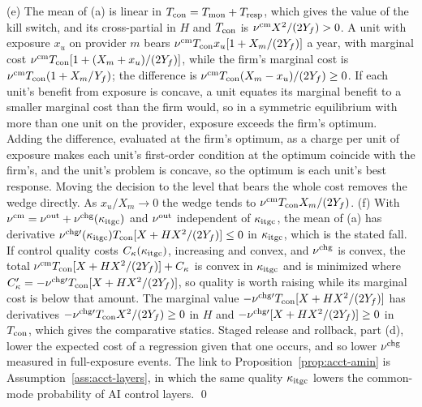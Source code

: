 (e) The mean of (a) is linear in $T_{\rm con}=T_{\rm mon}+T_{\rm resp}$, which gives the value of the kill switch, and its cross-partial in $H$ and $T_{\rm con}$ is $\nu^{\rm cm}X^2/(2Y_f)>0$. A unit with exposure $x_u$ on provider $m$ bears $\nu^{\rm cm}T_{\rm con}x_u[1+X_m/(2Y_f)]$ a year, with marginal cost $\nu^{\rm cm}T_{\rm con}[1+(X_m+x_u)/(2Y_f)]$, while the firm's marginal cost is $\nu^{\rm cm}T_{\rm con}(1+X_m/Y_f)$; the difference is $\nu^{\rm cm}T_{\rm con}(X_m-x_u)/(2Y_f)\ge0$. If each unit's benefit from exposure is concave, a unit equates its marginal benefit to a smaller marginal cost than the firm would, so in a symmetric equilibrium with more than one unit on the provider, exposure exceeds the firm's optimum. Adding the difference, evaluated at the firm's optimum, as a charge per unit of exposure makes each unit's first-order condition at the optimum coincide with the firm's, and the unit's problem is concave, so the optimum is each unit's best response. Moving the decision to the level that bears the whole cost removes the wedge directly. As $x_u/X_m\to0$ the wedge tends to $\nu^{\rm cm}T_{\rm con}X_m/(2Y_f)$.
(f) With $\nu^{\rm cm}=\nu^{\rm out}+\nu^{\rm chg}(\kappa_{\rm itgc})$ and $\nu^{\rm out}$ independent of $\kappa_{\rm itgc}$, the mean of (a) has derivative $\nu^{\rm chg\prime}(\kappa_{\rm itgc})T_{\rm con}[X+HX^2/(2Y_f)]\le0$ in $\kappa_{\rm itgc}$, which is the stated fall. If control quality costs $C_\kappa(\kappa_{\rm itgc})$, increasing and convex, and $\nu^{\rm chg}$ is convex, the total $\nu^{\rm cm}T_{\rm con}[X+HX^2/(2Y_f)]+C_\kappa$ is convex in $\kappa_{\rm itgc}$ and is minimized where $C_\kappa'=-\nu^{\rm chg\prime}T_{\rm con}[X+HX^2/(2Y_f)]$, so quality is worth raising while its marginal cost is below that amount. The marginal value $-\nu^{\rm chg\prime}T_{\rm con}[X+HX^2/(2Y_f)]$ has derivatives $-\nu^{\rm chg\prime}T_{\rm con}X^2/(2Y_f)\ge0$ in $H$ and $-\nu^{\rm chg\prime}[X+HX^2/(2Y_f)]\ge0$ in $T_{\rm con}$, which gives the comparative statics. Staged release and rollback, part (d), lower the expected cost of a regression given that one occurs, and so lower $\nu^{\rm chg}$ measured in full-exposure events. The link to Proposition~\ref{prop:acct-amin} is Assumption~\ref{ass:acct-layers}, in which the same quality $\kappa_{\rm itgc}$ lowers the common-mode probability of AI control layers. \qed

